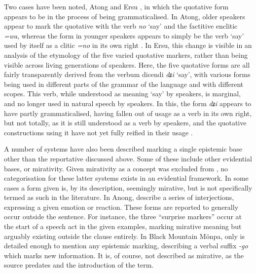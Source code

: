 Two cases have been noted, Atong \cite[Brahmaputran: India,][]{Breugel2014} and Ersu \cite[Ersuish: PRC,][]{Zhang2013}, in which the quotative form appears to be in the process of being grammaticalised. In Atong, older speakers appear to mark the quotative with the verb \textit{no} `say' and the factitive enclitic \textit{=wa}, whereas the form in younger speakers appears to simply be the verb `say' used by itself as a clitic \textit{=no} in its own right \cite[408]{Breugel2014}. In Ersu, this change is visible in an analysis of the etymology of the five varied quotative markers, rather than being visible across living generations of speakers. Here, the five quotative forms are all fairly transparently derived from the verbum dicendi \textit{dʑi} `say', with various forms being used in different parts of the grammar of the language and with different scopes. This verb, while understood as meaning `say' by speakers, is marginal, and no longer used in natural speech by speakers. In this, the form \textit{dʑi} appears to have partly grammaticalised, having fallen out of usage as a verb in its own right, but not totally, as it is still understood as a verb by speakers, and the quotative constructions using it have not yet fully reified in their usage \cite{Zhang2014}.

A number of systems have also been described marking a single epistemic base other than the reportative discussed above. Some of these include other evidential bases, or mirativity. Given mirativity as a concept was excluded from , no categorisation for these latter systems exists in an evidential framework. In some cases a form given is, by its description, seemingly mirative, but is not specifically termed as such in the literature. In Anong,  describe a series of interjections, expressing a given emotion or reaction. These forms are reported to generally occur outside the sentence. For instance, the three ``surprise markers'' \cite[111]{Sun2009} occur at the start of a speech act in the given examples, marking mirative meaning but arguably existing outside the clause entirely. In Black Mountain Mönpa, only  is detailed enough to mention any epistemic marking, describing a verbal suffix \textit{-go} which marks new information. It is, of course, not described as mirative, as the source predates  and the introduction of the term.

